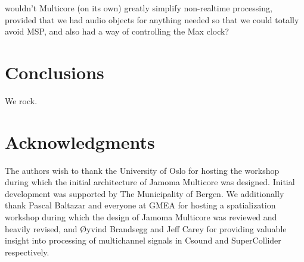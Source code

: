 \documentclass[twoside,a4paper]{article}
\begin{document}
wouldn't Multicore (on its own) greatly simplify non-realtime processing, provided that we had audio objects for anything needed so that we could totally avoid MSP, and also had a way of controlling the Max clock?



\section{Conclusions}
We rock.

%
%
%
%




\section{Acknowledgments}

The authors wish to thank the University of Oslo for hosting the workshop during which the initial architecture of Jamoma Multicore was designed. 
Initial development was supported by The Municipality of Bergen.  
We additionally thank Pascal Baltazar and everyone at GMEA for hosting a spatialization workshop during which the design of Jamoma Multicore was reviewed and heavily revised, and \O yvind Brandsegg and Jeff Carey for providing valuable insight into processing of multichannel signals in Csound and SuperCollider respectively.




\end{document}
